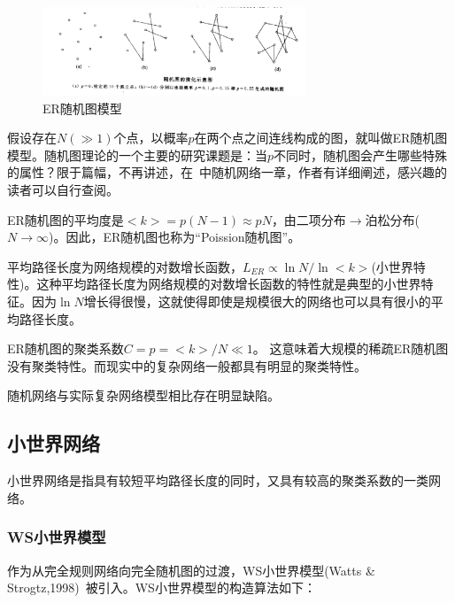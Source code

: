 \documentclass[11pt]{article}
\begin{document}
		\begin{figure}[htbp]
			\centering
			\includegraphics[width=0.7\textwidth]{pic/01-ERgraph.png}
			\caption{ER随机图模型}
		\end{figure}
		假设存在$N(\gg 1)$个点，以概率$p$在两个点之间连线构成的图，就叫做ER随机图模型。随机图理论的一个主要的研究课题是：当$p$不同时，随机图会产生哪些特殊的属性？限于篇幅，不再讲述，在~\cite{w1_book}中随机网络一章，作者有详细阐述，感兴趣的读者可以自行查阅。\par
		ER随机图的平均度是$<k> = p(N-1) \approx pN$，由二项分布$\rightarrow $泊松分布($N\rightarrow \infty$)。因此，ER随机图也称为“Poission随机图”。\par
		平均路径长度为网络规模的对数增长函数，$L_{ER} \propto \ln N / \ln <k>$(小世界特性)。这种平均路径长度为网络规模的对数增长函数的特性就是典型的小世界特征。因为$\ln N$增长得很慢，这就使得即使是规模很大的网络也可以具有很小的平均路径长度。\par
		ER随机图的聚类系数$C=p=<k>/N \ll 1$。 这意味着大规模的稀疏ER随机图没有聚类特性。而现实中的复杂网络一般都具有明显的聚类特性。\par
		随机网络与实际复杂网络模型相比存在明显缺陷。
		

	\subsection{小世界网络}
		小世界网络是指具有较短平均路径长度的同时，又具有较高的聚类系数的一类网络。\par
		
		\subsubsection*{WS小世界模型}
		作为从完全规则网络向完全随机图的过渡，WS小世界模型(Watts \& Strogtz,1998)~\cite{paper_02}被引入。WS小世界模型的构造算法如下：
		
		\begin{center}
		\end{center}
	
\end{document}
